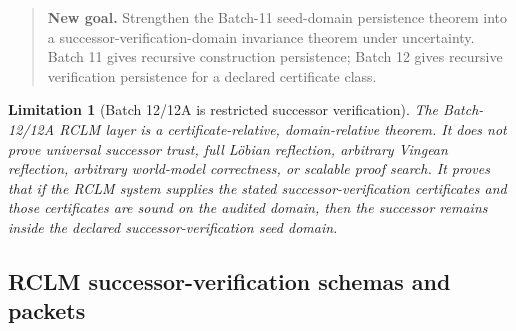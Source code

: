 \documentclass[11pt,a4paper]{article}
\newtheorem{limitation}[theorem]{Limitation}
\begin{document}
\begin{quote}
\textbf{New goal.} Strengthen the Batch-11 seed-domain persistence theorem into a successor-verification-domain invariance theorem under uncertainty.  Batch 11 gives recursive construction persistence; Batch 12 gives recursive verification persistence for a declared certificate class.
\end{quote}

\begin{limitation}[Batch 12/12A is restricted successor verification]
The Batch-12/12A RCLM layer is a certificate-relative, domain-relative theorem. It does not prove universal successor trust, full L\"obian reflection, arbitrary Vingean reflection, arbitrary world-model correctness, or scalable proof search. It proves that if the RCLM system supplies the stated successor-verification certificates and those certificates are sound on the audited domain, then the successor remains inside the declared successor-verification seed domain.
\end{limitation}

\subsection{RCLM successor-verification schemas and packets}
\end{document}
